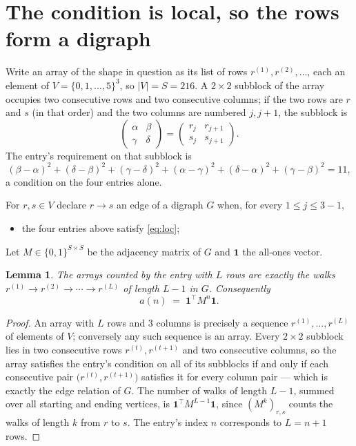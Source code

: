 \documentclass[11pt,a4paper]{article}
\theoremstyle{plain}
\newtheorem{lemma}[theorem]{Lemma}
\theoremstyle{definition}
\begin{document}
\section{The condition is local, so the rows form a digraph}

Write an array of the shape in question as its list of rows
$r^{(1)},r^{(2)},\dots$, each an element of
$V=\{0,1,\dots,5\}^{3}$, so $|V|=S=216$. A $2\times2$ subblock of the array
occupies two consecutive rows and two consecutive columns; if the two rows are $r$
and $s$ (in that order) and the two columns are numbered $j,j+1$,
the subblock is
\[
\begin{pmatrix}\alpha&\beta\\\gamma&\delta\end{pmatrix}=\begin{pmatrix}r_j&r_{j+1}\\s_j&s_{j+1}\end{pmatrix}.
\]
The entry's requirement on that subblock is
\begin{equation}\label{eq:loc}
(\beta-\alpha)^2+(\delta-\beta)^2+(\gamma-\delta)^2+(\alpha-\gamma)^2+(\delta-\alpha)^2+(\gamma-\beta)^2=11,
\end{equation}
a condition on the four entries alone.

For $r,s\in V$ declare $r\to s$ an edge of a digraph $G$ when, for every
$1\le j\le 3-1$,
\begin{itemize}
\item the four entries above satisfy \eqref{eq:loc};

\end{itemize}
Let $M\in\{0,1\}^{S\times S}$ be the adjacency matrix of $G$ and $\mathbf{1}$ the
all-ones vector.

\begin{lemma}\label{lem:walk}
The arrays counted by the entry with $L$ rows are exactly the walks
$r^{(1)}\to r^{(2)}\to\cdots\to r^{(L)}$ of length $L-1$ in $G$. Consequently
\[
a(n)\;=\;\mathbf{1}^{\!\top}M^{n}\mathbf{1} .
\]
\end{lemma}

\begin{proof}
An array with $L$ rows and $3$ columns is precisely a sequence
$r^{(1)},\dots,r^{(L)}$ of elements of $V$; conversely any such sequence is an array.
Every $2\times2$ subblock lies in two consecutive rows $r^{(t)},r^{(t+1)}$ and two
consecutive columns, so the array satisfies the entry's condition on all of its subblocks
if and only if each consecutive pair $\bigl(r^{(t)},r^{(t+1)}\bigr)$ satisfies it for
every column pair --- which is exactly the edge relation of $G$. The number of walks of
length $L-1$, summed over all starting and ending vertices, is
$\mathbf{1}^{\!\top}M^{L-1}\mathbf{1}$, since $(M^{k})_{r,s}$ counts the walks of
length $k$ from $r$ to $s$. The entry's index $n$ corresponds to $L=n+1$ rows.
\end{proof}
\end{document}
